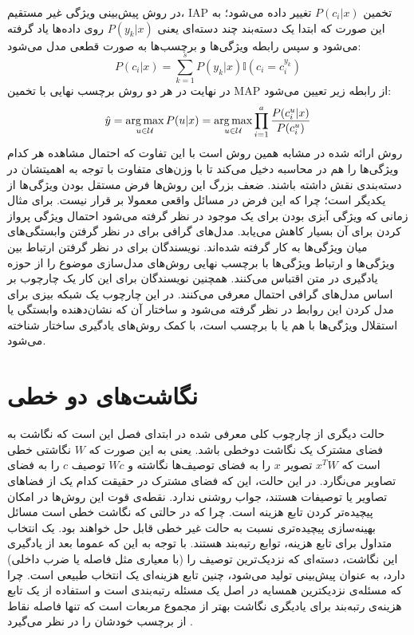 در روش پیش‌بینی ویژگی غیر مستقیم، IAP
 تخمین  $P(c_i|x) $ تغییر داده می‌شود؛ به این صورت که ابتدا یک دسته‌بند چند دسته‌ای یعنی $P(y_k |x)$ روی داده‌ها یاد گرفته می‌شود و سپس رابطه ویژگی‌ها و برچسب‌ها به صورت قطعی مدل می‌شود:
\begin{equation}
P(c_i | x) = \sum_{k=1}^s P(y_k | x) \mathbb{I}(c_i = c^{y_k}_i)
\end{equation}
در نهایت در هر دو روش برچسب نهایی با تخمین MAP 
از رابطه زیر تعیین می‌شود:
\begin{equation}
\hat{y} = \operatorname*{arg\,max}_{u \in \mathcal{U}} P(u|x) =  \operatorname*{arg\,max}_{u \in \mathcal{U}} \prod_{i=1}^a \frac{P(c_i^u | x)}{P(c_i^u)}
\end{equation}
روش ارائه شده در 
\cite{suzuki14}
مشابه همین روش است با این تفاوت که احتمال مشاهده هر کدام ویژگی‌ها را هم در محاسبه دخیل می‌کند تا با وزن‌های متفاوت با توجه به اهمیتشان در دسته‌بندی نقش داشته باشند. ضعف بزرگ این روش‌ها فرض مستقل بودن ویژگی‌ها از یکدیگر است؛ چرا که این فرض در مسائل واقعی معمولا بر قرار نیست. برای مثال زمانی که ویژگی آبزی بودن برای یک موجود در نظر گرفته می‌شود احتمال ویژگی پرواز کردن برای آن بسیار کاهش می‌یابد. مدل‌های گرافی برای در نظر گرفتن وابستگی‌های میان ویژگی‌ها به کار گرفته شده‌اند. نویسندگان \cite{topicmodel} برای در نظر گرفتن ارتباط بین ویژگی‌ها و ارتباط ویژگی‌ها با برچسب نهایی روش‌های مدل‌سازی موضوع  را از حوزه یادگیری در متن اقتباس می‌کنند. همچنین  نویسندگان \cite{unified13} برای این کار یک چارچوب بر اساس مدل‌های گرافی احتمال معرفی می‌کنند. در این چارچوب یک شبکه بیزی  برای مدل کردن این روابط در نظر گرفته می‌شود و ساختار آن که نشان‌دهنده وابستگی یا استقلال ویژگی‌ها با هم یا با برچسب است، با کمک روش‌های یادگیری ساختار 
شناخته می‌شود. 

\section{نگاشت‌های دو خطی}
حالت دیگری از چارچوب کلی معرفی شده در ابتدای فصل این است که نگاشت به فضای مشترک یک نگاشت دوخطی باشد. یعنی به این صورت که $W$ نگاشتی خطی است که $x^TW$ تصویر $x$ را به فضای توصیف‌ها نگاشته و $Wc$ توصیف $c$ را به فضای تصاویر می‌نگارد. در این حالت، این که فضای مشترک در حقیقت کدام یک از فضاهای تصاویر یا توصیفات هستند، جواب روشنی ندارد. نقطه‌ی قوت این روش‌ها در امکان پیچیده‌تر کردن تابع هزینه است. چرا که در حالتی که نگاشت خطی است مسائل بهینه‌سازی پیچیده‌تری نسبت به حالت غیر خطی قابل حل خواهند بود. یک انتخاب متداول برای تابع هزینه، توابع رتبه‌بند 
هستند. با توجه به این که عموما بعد از یادگیری این نگاشت، دسته‌ای که نزدیک‌ترین توصیف را (با معیاری مثل فاصله یا ضرب داخلی) دارد، به عنوان پیش‌بینی تولید می‌شود،
 چنین تابع هزینه‌ای یک انتخاب طبیعی است. چرا که مسئله‌ی نزدیکترین همسایه در اصل یک مسئله رتبه‌بندی
 است و استفاده از یک تابع هزینه‌ی رتبه‌بند برای یادیگری نگاشت بهتر از مجموع مربعات است که تنها فاصله نقاط از برچسب خودشان را در نظر می‌گیرد \cite{devise}. 
 
